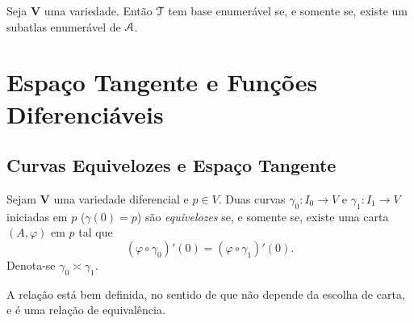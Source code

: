 \begin{prop}
Seja $\bm V$ uma variedade. Então $\mathcal{T}$ tem base enumerável se, e somente se, existe um subatlas enumerável de $\mathcal{A}$.
\end{prop}

















\section{Espaço Tangente e Funções Diferenciáveis}

\subsection{Curvas Equivelozes e Espaço Tangente}

\begin{defi}
Sejam $\bm V$ uma variedade diferencial e $p \in V$. Duas curvas $\gamma_0: I_0 \to V$ e $\gamma_1: I_1 \to V$ iniciadas em $p$ ($\gamma(0)=p$) são \emph{equivelozes} se, e somente se, existe uma carta $(A,\varphi)$ em $p$ tal que
	\begin{equation*}
	(\varphi \circ \gamma_0)'(0) = (\varphi \circ \gamma_1)'(0).
	\end{equation*}
Denota-se $\gamma_0 \asymp \gamma_1$.
\end{defi}

A relação está bem definida, no sentido de que não depende da escolha de carta, e é uma relação de equivalência.

